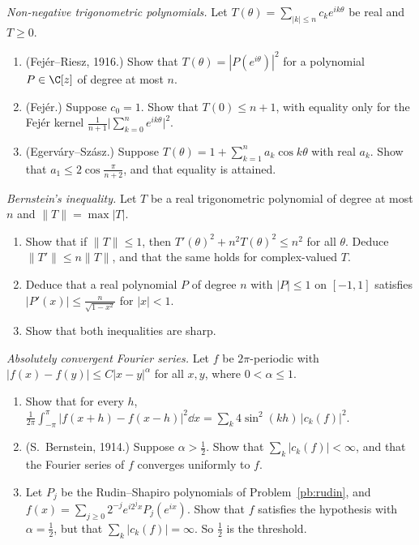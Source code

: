 \begin{exercise}[$\star\star\star$]\label{pb:fejer}
\emph{Non-negative trigonometric polynomials.} Let $T(\theta)=\sum_{|k|\le n}c_ke^{ik\theta}$ be real and $T\ge0$.
\begin{enumerate}[label=(\alph*)]
\item (Fejér--Riesz, 1916.) Show that $T(\theta)=|P(e^{i\theta})|^2$ for a polynomial $P\in\C[z]$ of degree at most $n$.
\item (Fejér.) Suppose $c_0=1$. Show that $T(0)\le n+1$, with equality only for the Fejér kernel $\frac1{n+1}\bigl|\sum_{k=0}^ne^{ik\theta}\bigr|^2$.
\item (Egerváry--Szász.) Suppose $T(\theta)=1+\sum_{k=1}^na_k\cos k\theta$ with real $a_k$. Show that $a_1\le2\cos\frac\pi{n+2}$, and that equality is
attained.
\end{enumerate}
\end{exercise}

\begin{exercise}[$\star\star\star$]\label{pb:bernstein}
\emph{Bernstein's inequality.} Let $T$ be a real trigonometric polynomial of degree at most $n$ and $\|T\|=\max|T|$.
\begin{enumerate}[label=(\alph*)]
\item Show that if $\|T\|\le1$, then $T'(\theta)^2+n^2T(\theta)^2\le n^2$ for all $\theta$. Deduce $\|T'\|\le n\|T\|$, and that the same holds for
complex-valued $T$.
\item Deduce that a real polynomial $P$ of degree $n$ with $|P|\le1$ on $[-1,1]$ satisfies $|P'(x)|\le\frac n{\sqrt{1-x^2}}$ for $|x|<1$.
\item Show that both inequalities are sharp.
\end{enumerate}
\end{exercise}

\begin{exercise}[$\star\star\star$]\label{pb:bernsteinabs}
\emph{Absolutely convergent Fourier series.} Let $f$ be $2\pi$-periodic with $|f(x)-f(y)|\le C|x-y|^\alpha$ for all $x,y$, where
$0<\alpha\le1$.
\begin{enumerate}[label=(\alph*)]
\item Show that for every $h$, $\frac1{2\pi}\int_{-\pi}^\pi|f(x+h)-f(x-h)|^2\dd x=\sum_k4\sin^2(kh)\,|c_k(f)|^2$.
\item (S.~Bernstein, 1914.) Suppose $\alpha>\frac12$. Show that $\sum_k|c_k(f)|<\infty$, and that the Fourier series of $f$ converges
uniformly to $f$.
\item Let $P_j$ be the Rudin--Shapiro polynomials of Problem~\ref{pb:rudin}, and $f(x)=\sum_{j\ge0}2^{-j}e^{i2^jx}P_j(e^{ix})$. Show that $f$
satisfies the hypothesis with $\alpha=\frac12$, but that $\sum_k|c_k(f)|=\infty$. So $\frac12$ is the threshold.
\end{enumerate}
\end{exercise}

